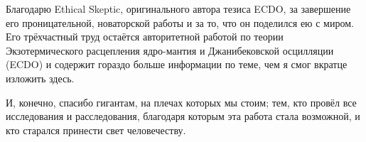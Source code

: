 \documentclass[10pt,twocolumn,letterpaper]{article}
\begin{document}
Благодарю Ethical Skeptic, оригинального автора тезиса ECDO, за завершение его проницательной, новаторской работы и за то, что он поделился ею с миром. Его трёхчастный труд \cite{1} остаётся авторитетной работой по теории Экзотермического расцепления ядро-мантия и Джанибековской осцилляции (ECDO) и содержит гораздо больше информации по теме, чем я смог вкратце изложить здесь.

И, конечно, спасибо гигантам, на плечах которых мы стоим; тем, кто провёл все исследования и расследования, благодаря которым эта работа стала возможной, и кто старался принести свет человечеству.
{\small
\renewcommand{\refname}{References}


}
\end{document}
